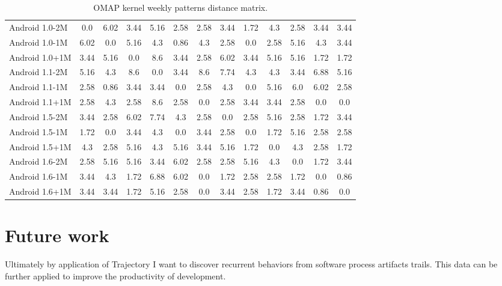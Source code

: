 \documentclass[a4paper,10pt]{article}
\numberwithin{equation}{subsection}
\begin{document}
\begin{table}
  \caption{OMAP kernel weekly patterns distance matrix.}
  \centering
  \label{tab:omap_weekly_distance}
  \begin{tabularx}{450pt}{ | X | c | c | c | c | c | c | c | c | c | c | c | c |}
  \hline                       
  &  & & & & & & & & & & & \\
  \hline 
Android 1.0-2M & 0.0 & 6.02 & 3.44 & 5.16 & 2.58 & 2.58 & 3.44 & 1.72 & 4.3 & 2.58 & 3.44 & 3.44\\ 
Android 1.0-1M & 6.02 & 0.0 & 5.16 & 4.3 & 0.86 & 4.3 & 2.58 & 0.0 & 2.58 & 5.16 & 4.3 & 3.44\\ 
Android 1.0+1M & 3.44 & 5.16 & 0.0 & 8.6 & 3.44 & 2.58 & 6.02 & 3.44 & 5.16 & 5.16 & 1.72 & 1.72\\ 
Android 1.1-2M & 5.16 & 4.3 & 8.6 & 0.0 & 3.44 & 8.6 & 7.74 & 4.3 & 4.3 & 3.44 & 6.88 & 5.16\\ 
Android 1.1-1M & 2.58 & 0.86 & 3.44 & 3.44 & 0.0 & 2.58 & 4.3 & 0.0 & 5.16 & 6.0 & 6.02 & 2.58\\ 
Android 1.1+1M & 2.58 & 4.3 & 2.58 & 8.6 & 2.58 & 0.0 & 2.58 & 3.44 & 3.44 & 2.58 & 0.0 & 0.0\\ 
Android 1.5-2M & 3.44 & 2.58 & 6.02 & 7.74 & 4.3 & 2.58 & 0.0 & 2.58 & 5.16 & 2.58 & 1.72 & 3.44\\ 
Android 1.5-1M & 1.72 & 0.0 & 3.44 & 4.3 & 0.0 & 3.44 & 2.58 & 0.0 & 1.72 & 5.16 & 2.58 & 2.58\\ 
Android 1.5+1M & 4.3 & 2.58 & 5.16 & 4.3 & 5.16 & 3.44 & 5.16 & 1.72 & 0.0 & 4.3 & 2.58 & 1.72\\ 
Android 1.6-2M & 2.58 & 5.16 & 5.16 & 3.44 & 6.02 & 2.58 & 2.58 & 5.16 & 4.3 & 0.0 & 1.72 & 3.44\\ 
Android 1.6-1M & 3.44 & 4.3 & 1.72 & 6.88 & 6.02 & 0.0 & 1.72 & 2.58 & 2.58 & 1.72 & 0.0 & 0.86\\ 
Android 1.6+1M & 3.44 & 3.44 & 1.72 & 5.16 & 2.58 & 0.0 & 3.44 & 2.58 & 1.72 & 3.44 & 0.86 & 0.0\\
  \hline  
  \end{tabularx}
\end{table}

\section{Future work}
Ultimately by application of Trajectory I want to discover recurrent behaviors from
software process artifacts trails. This data can be further applied to improve the
productivity of development.
\end{document}
